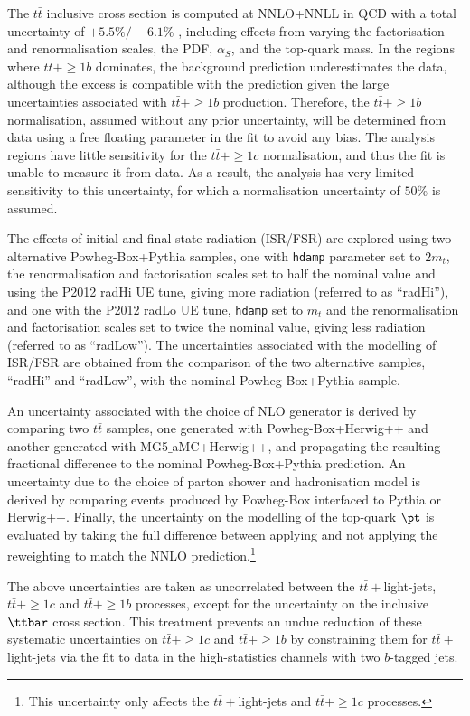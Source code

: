 The $t\bar{t}$ inclusive cross section is computed at NNLO+NNLL in QCD with a total uncertainty of $+5.5\%/-6.1\%$ \cite{topPP}, including effects from varying the factorisation and renormalisation scales, the PDF, $\alpha_{S}$, and the top-quark mass. In the regions where $t\bar{t}+\ge1b$ dominates, the background prediction underestimates the data, although the excess is compatible with the prediction given the large uncertainties associated with $t\bar{t}+\ge1b$ production. Therefore, the $t\bar{t}+\ge1b$ normalisation, assumed without any prior uncertainty, will be determined from data using a free floating parameter in the fit to avoid any bias. The analysis regions have little sensitivity for the $t\bar{t}+\ge1c$ normalisation, and thus the fit is unable to measure it from data. As a result, the analysis has very limited sensitivity to this uncertainty, for which a normalisation uncertainty of $50\%$ is assumed.\par
The effects of initial and final-state radiation (ISR/FSR) are explored using two alternative {\sc Powheg-Box+Pythia} samples, one with {\tt hdamp} parameter set to $2m_{t}$, the renormalisation and factorisation scales set to half the nominal value and using the P2012 radHi UE tune, giving more radiation (referred to as ``radHi''), and one with the P2012 radLo UE tune, {\tt hdamp} set to $m_{t}$ and the renormalisation and factorisation scales set to twice the nominal value, giving less radiation (referred to as ``radLow''). The uncertainties associated with the modelling of ISR/FSR are obtained from the comparison of the two alternative samples, ``radHi'' and ``radLow'',  with the nominal {\sc Powheg-Box+Pythia} sample.\par
An uncertainty associated with the choice of NLO generator is derived by comparing two $t\bar{t}$ samples, one generated with {\sc Powheg-Box+Herwig++} and another generated with {\sc MG5$\_$aMC+Herwig++}, and propagating the resulting fractional difference to the nominal {\sc Powheg-Box+Pythia} prediction.
An uncertainty due to the choice of parton shower and hadronisation model is derived by comparing events produced by {\sc Powheg-Box} interfaced to {\sc Pythia} or {\sc Herwig++}.
Finally, the uncertainty on the modelling of the top-quark $\pt$ is evaluated by taking the full difference between applying and not applying the reweighting to match the NNLO prediction.\footnote{This uncertainty only affects the $t\bar{t}+$light-jets and $t\bar{t}+\ge1c$ processes.} \par
The above uncertainties are taken as uncorrelated between the $t\bar{t}+$light-jets, $t\bar{t}+\ge1c$ and $t\bar{t}+\ge1b$ processes, except for the uncertainty on the inclusive $\ttbar$ cross section. This treatment prevents an undue reduction of these systematic uncertainties on $t\bar{t}+\ge1c$ and $t\bar{t}+\ge1b$ by constraining them for $t\bar{t}+$light-jets via the fit to data in the high-statistics channels with two $b$-tagged jets.
